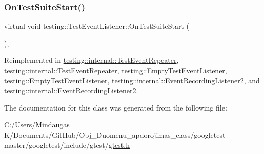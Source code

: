 \mbox{\label{classtesting_1_1_test_event_listener_a2726cc70dfda861f109355f1d9f09dfe}} 
\subsubsection{\texorpdfstring{OnTestSuiteStart()}{OnTestSuiteStart()}\hspace{0.1cm}{\footnotesize\ttfamily [2/2]}}
{\footnotesize\ttfamily virtual void testing\+::\+Test\+Event\+Listener\+::\+On\+Test\+Suite\+Start (\begin{DoxyParamCaption}\item[{const \mbox{\hyperlink{classtesting_1_1_test_suite}{Test\+Suite}} \&}]{ }\end{DoxyParamCaption})\hspace{0.3cm}{\ttfamily [inline]}, {\ttfamily [virtual]}}



Reimplemented in \mbox{\hyperlink{classtesting_1_1internal_1_1_test_event_repeater_aa54fdafe6dfdd46dbac108c17016a5f9}{testing\+::internal\+::\+Test\+Event\+Repeater}}, \mbox{\hyperlink{classtesting_1_1internal_1_1_test_event_repeater_aa54fdafe6dfdd46dbac108c17016a5f9}{testing\+::internal\+::\+Test\+Event\+Repeater}}, \mbox{\hyperlink{classtesting_1_1_empty_test_event_listener_a1e32e4bd4857822b6b50e6900aa5c651}{testing\+::\+Empty\+Test\+Event\+Listener}}, \mbox{\hyperlink{classtesting_1_1_empty_test_event_listener_a1e32e4bd4857822b6b50e6900aa5c651}{testing\+::\+Empty\+Test\+Event\+Listener}}, \mbox{\hyperlink{classtesting_1_1internal_1_1_event_recording_listener2_a6bc3ac71f7f96e9c62b0c7dffd5f66b0}{testing\+::internal\+::\+Event\+Recording\+Listener2}}, and \mbox{\hyperlink{classtesting_1_1internal_1_1_event_recording_listener2_a6bc3ac71f7f96e9c62b0c7dffd5f66b0}{testing\+::internal\+::\+Event\+Recording\+Listener2}}.



The documentation for this class was generated from the following file\+:\begin{DoxyCompactItemize}
\item 
C\+:/\+Users/\+Mindaugas K/\+Documents/\+Git\+Hub/\+Obj\+\_\+\+Duomenu\+\_\+apdorojimas\+\_\+class/googletest-\/master/googletest/include/gtest/\mbox{\hyperlink{googletest-master_2googletest_2include_2gtest_2gtest_8h}{gtest.\+h}}\end{DoxyCompactItemize}

